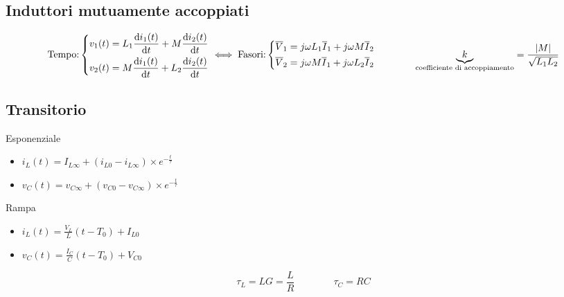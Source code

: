 \documentclass[10pt]{article}
\begin{document}
    \vspace{-3.5\baselineskip}
    \subsection*{Induttori mutuamente accoppiati}

        \[
            \text{Tempo:}
            \left\{
                \begin{gathered}
                    v_1 (t) = L_1 \dv{i_1 (t)}{t} + M \dv{i_2 (t)}{t}\\
                    v_2 (t) = M \dv{i_1 (t)}{t} + L_2 \dv{i_2 (t)}{t}
                \end{gathered}
            \right.
            \iff
            \text{Fasori:}
            \left\{
                \begin{gathered}
                    \overline{V}_1 = j \omega L_1 \overline{I}_1 + j \omega M \overline{I}_2\\
                    \overline{V}_2 = j \omega M \overline{I}_1 + j \omega L_2 \overline{I}_2
                \end{gathered}
            \right.
            \qquad\qquad
            \underbrace{k}_{\text{coefficiente di accoppiamento}} = \frac{|M|}{\sqrt{L_1 L_2}}
        \]

    \vspace{-1.5\baselineskip}
    \subsection*{Transitorio}
    \vspace{-1.5\baselineskip}

        \begin{multicols}{3}
            
            Esponenziale
            \begin{itemize}
                \item \(i_L (t) = I_{L \infty} + (i_{L0} - i_{L\infty}) \times e^{-\frac{t}{\tau}}\)
                \item \(v_C (t) = v_{C \infty} + (v_{C 0} - v_{C \infty}) \times e^{-\frac{t}{\tau}}\)
            \end{itemize}

            \vfill\null
            \columnbreak

            Rampa
            \begin{itemize}
                \item \(i_L (t) = \frac{V_L}{L} (t - T_0) + I_{L0}\)
                \item \(v_C (t) = \frac{I_C}{C} (t - T_0) + V_{C0}\)
            \end{itemize}

            \vfill\null
            \columnbreak

            \[
                \tau_L = LG = \frac{L}{R}
                \qquad\qquad
                \tau_C = RC
            \]

        \end{multicols}
\end{document}
